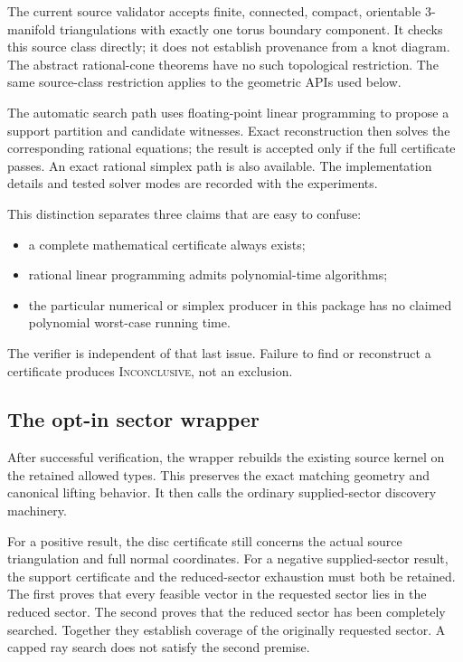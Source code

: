 \documentclass[11pt]{article}
\theoremstyle{definition}
\theoremstyle{remark}
\newcommand{\Unknown}{\textsc{Inconclusive}}
\begin{document}
The current source validator accepts finite, connected, compact, orientable
3-manifold triangulations with exactly one torus boundary component.
It checks this source class directly; it does not establish provenance
from a knot diagram. The abstract rational-cone theorems have no such
topological restriction. The same source-class restriction applies to
the geometric APIs used below.

The automatic search path uses floating-point linear programming to
propose a support partition and candidate witnesses. Exact reconstruction
then solves the corresponding rational equations; the result is accepted
only if the full certificate passes. An exact rational simplex path is
also available. The implementation details and tested solver modes are
recorded with the experiments.

This distinction separates three claims that are easy to confuse:
\begin{itemize}
\item a complete mathematical certificate always exists;
\item rational linear programming admits polynomial-time algorithms;
\item the particular numerical or simplex producer in this package has
no claimed polynomial worst-case running time.
\end{itemize}
The verifier is independent of that last issue. Failure to find or
reconstruct a certificate produces \Unknown, not an exclusion.



\subsection{The opt-in sector wrapper}

After successful verification, the wrapper rebuilds the existing source
kernel on the retained allowed types. This preserves the exact matching
geometry and canonical lifting behavior. It then calls the ordinary
supplied-sector discovery machinery.

For a positive result, the disc certificate still concerns the actual
source triangulation and full normal coordinates. For a negative
supplied-sector result, the support certificate and the reduced-sector
exhaustion must both be retained. The first proves that every feasible
vector in the requested sector lies in the reduced sector. The second
proves that the reduced sector has been completely searched. Together
they establish coverage of the originally requested sector. A capped
ray search does not satisfy the second premise.
\end{document}
